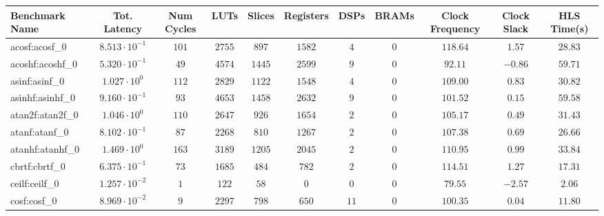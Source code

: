 \begin{tabular}{|l|c|c|c|c|c|c|c|c|c|c|}
\hline
Benchmark Name               & Tot. Latency            & Num Cycles & LUTs      & Slices    & Registers & DSPs    & BRAMs & Clock Frequency & Clock Slack & HLS Time(s) \\
\hline
acosf:acosf\_0               & $ 8.513 \cdot 10^{-1} $ & $ 101    $ & $ 2755  $ & $ 897   $ & $ 1582  $ & $ 4   $ & $ 0 $ & $ 118.64      $ & $ 1.57    $ & $ 28.83   $ \\
acoshf:acoshf\_0             & $ 5.320 \cdot 10^{-1} $ & $ 49     $ & $ 4574  $ & $ 1445  $ & $ 2599  $ & $ 9   $ & $ 0 $ & $ 92.11       $ & $ -0.86   $ & $ 59.71   $ \\
asinf:asinf\_0               & $ 1.027 \cdot 10^{0}  $ & $ 112    $ & $ 2829  $ & $ 1122  $ & $ 1548  $ & $ 4   $ & $ 0 $ & $ 109.00      $ & $ 0.83    $ & $ 30.82   $ \\
asinhf:asinhf\_0             & $ 9.160 \cdot 10^{-1} $ & $ 93     $ & $ 4653  $ & $ 1458  $ & $ 2632  $ & $ 9   $ & $ 0 $ & $ 101.52      $ & $ 0.15    $ & $ 59.58   $ \\
atan2f:atan2f\_0             & $ 1.046 \cdot 10^{0}  $ & $ 110    $ & $ 2647  $ & $ 926   $ & $ 1654  $ & $ 2   $ & $ 0 $ & $ 105.17      $ & $ 0.49    $ & $ 31.43   $ \\
atanf:atanf\_0               & $ 8.102 \cdot 10^{-1} $ & $ 87     $ & $ 2268  $ & $ 810   $ & $ 1267  $ & $ 2   $ & $ 0 $ & $ 107.38      $ & $ 0.69    $ & $ 26.66   $ \\
atanhf:atanhf\_0             & $ 1.469 \cdot 10^{0}  $ & $ 163    $ & $ 3189  $ & $ 1205  $ & $ 2045  $ & $ 2   $ & $ 0 $ & $ 110.95      $ & $ 0.99    $ & $ 33.84   $ \\
cbrtf:cbrtf\_0               & $ 6.375 \cdot 10^{-1} $ & $ 73     $ & $ 1685  $ & $ 484   $ & $ 782   $ & $ 2   $ & $ 0 $ & $ 114.51      $ & $ 1.27    $ & $ 17.31   $ \\
ceilf:ceilf\_0               & $ 1.257 \cdot 10^{-2} $ & $ 1      $ & $ 122   $ & $ 58    $ & $ 0     $ & $ 0   $ & $ 0 $ & $ 79.55       $ & $ -2.57   $ & $ 2.06    $ \\
cosf:cosf\_0                 & $ 8.969 \cdot 10^{-2} $ & $ 9      $ & $ 2297  $ & $ 798   $ & $ 650   $ & $ 11  $ & $ 0 $ & $ 100.35      $ & $ 0.04    $ & $ 11.80   $ \\

\end{tabular}
